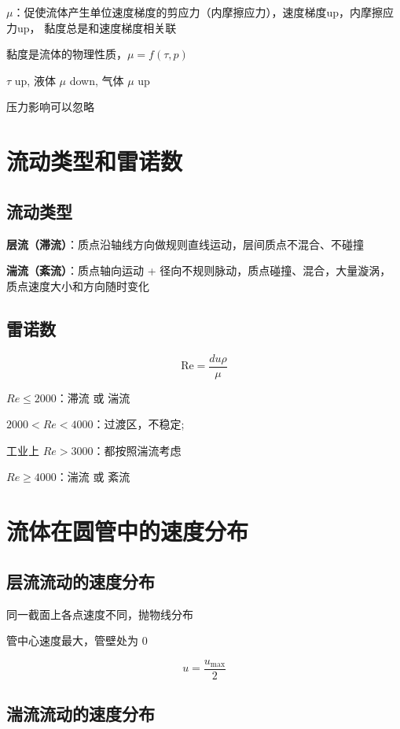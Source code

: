 \documentclass{book}
\DeclareRobustCommand{\bluebold}[1]{\textbf{\textcolor[rgb]{0.31,0.63,0.86}{#1}}}
\begin{document}
$\mu$：促使流体产生单位速度梯度的剪应力（内摩擦应力），速度梯度up，内摩擦应力up，
黏度总是和速度梯度相关联

黏度是流体的物理性质，$\mu = f(\tau, p)$

$\tau$ up, 液体 $\mu$ down, 气体 $\mu$ up

压力影响可以忽略

\chapter{流动类型和雷诺数}

\section{流动类型}

\bluebold{层流（滞流）}：质点沿轴线方向做规则直线运动，层间质点不混合、不碰撞

\bluebold{湍流（紊流）}：质点轴向运动 + 径向不规则脉动，质点碰撞、混合，大量漩涡，
质点速度大小和方向随时变化

\section{雷诺数}

\begin{equation}
\mathrm{Re} = \frac{d u \rho}{\mu}
\end{equation}

$Re \leq 2000$：滞流 或 湍流

$2000 < Re < 4000$：过渡区，不稳定;

工业上 $Re > 3000$：都按照湍流考虑

$Re \geq 4000$：湍流 或 紊流


\chapter{流体在圆管中的速度分布}

\section{层流流动的速度分布}

同一截面上各点速度不同，抛物线分布

管中心速度最大，管壁处为 0

\begin{equation}
u = \frac{u_\text{max}}{2}
\end{equation}

\section{湍流流动的速度分布}
\end{document}
